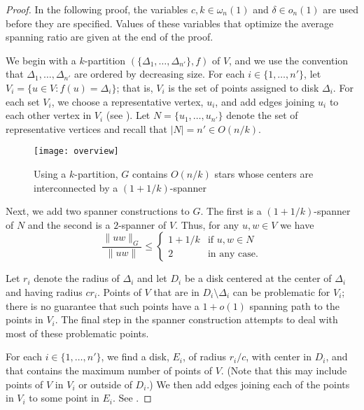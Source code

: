 \documentclass{patmorin}
\begin{document}
\begin{proof}
  In the following proof, the variables $c,k\in\omega_n(1)$ and $\delta\in
  o_n(1)$ are used before they are specified.  Values of these variables
  that optimize the average spanning ratio are given at the end of
  the proof.

  We begin with a $k$-partition $(\{\Delta_1,\ldots,\Delta_{n'}\},f)$
  of $V$, and we use the convention that $\Delta_1,\ldots,\Delta_{n'}$
  are ordered by decreasing size.  For each $i\in \{1,\ldots,n'\}$,
  let $V_i=\{u\in V : f(u)=\Delta_i\}$; that is, $V_i$ is the set of
  points assigned to disk $\Delta_i$.  For each set $V_i$, we choose a
  representative vertex, $u_i$, and add edges joining $u_i$ to each other
  vertex in $V_i$ (see ). Let $N=\{u_1,\ldots,u_{n'}\}$
  denote the set of representative vertices and recall that $|N|=n'\in
  O(n/k)$.
  
  \begin{figure}
    \begin{center} 
      \texttt{[image: overview]}
    \end{center} 
    \caption{Using a $k$-partition, $G$ contains $O(n/k)$ stars whose
      centers are interconnected by a $(1+1/k)$-spanner}
  \end{figure}

  Next, we add two spanner constructions to $G$.  The first is a
  $(1+1/k)$-spanner of $N$ and the second is a $2$-spanner of $V$.
  Thus, for any $u,w\in V$ we have
  \[
     \frac{\|uw\|_G}{\|uw\|} \le \begin{cases}
           1+1/k & \text{if $u,w\in N$} \\
           2 & \text{in any case.}
         \end{cases}
  \]
  
  Let $r_i$ denote the radius of $\Delta_i$ and let $D_i$ be a disk
  centered at the center of $\Delta_i$ and having radius $cr_i$.
  Points of $V$ that are in $D_i\setminus \Delta_i$ can be problematic
  for $V_i$; there is no guarantee that such points have a $1+o(1)$
  spanning path to the points in $V_i$.
  The final step in the spanner construction attempts to deal with
  most of these problematic points.

  For each $i\in\{1,\ldots,n'\}$, we find a disk, $E_i$, of radius
  $r_i/c$, with center in $D_i$, and that contains the maximum number
  of points of $V$.  (Note that this may include points of $V$ in $V_i$
  or outside of $D_i$.)  We then add edges joining each of the points
  in $V_i$ to some point in $E_i$.  See .


\end{proof}
\end{document}
